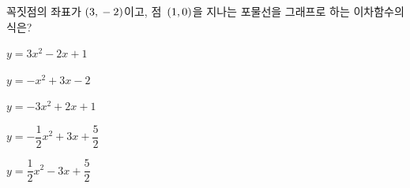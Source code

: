 꼭짓점의 좌표가 $(3{,}\mkern3mu -2)$이고, 점~$(1{,}\mkern3mu 0)$을 지나는 포물선을 그래프로 하는 이차함수의 식은?
\begin{choicesii}{\rule[-3ex]{0pt}{8ex}$y=3x^2-2x+1$}{\rule[-3ex]{0pt}{8ex}$y=-x^2+3x-2$}{\rule[-3ex]{0pt}{8ex}$y=-3x^2+2x+1$}{\rule[-3ex]{0pt}{8ex}$y=-\dfrac{1}{2}x^2+3x+\dfrac{5}{2}$}{\rule[-3ex]{0pt}{8ex}$y=\dfrac{1}{2}x^2-3x+\dfrac{5}{2}$}\end{choicesii}
